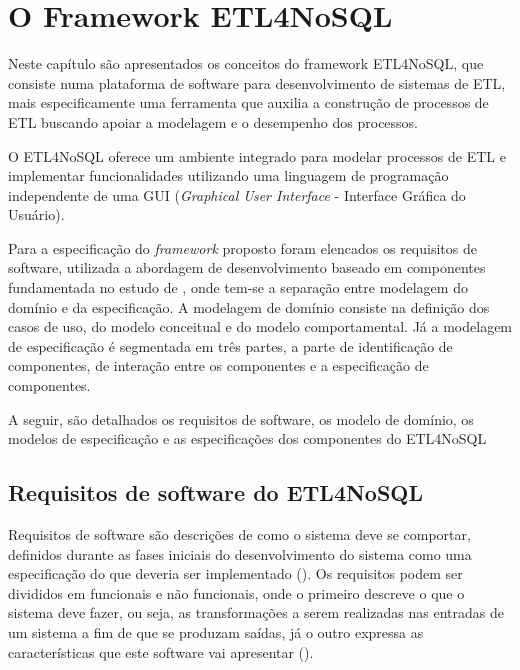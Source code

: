 \chapter{O Framework ETL4NoSQL}
Neste capítulo são apresentados os conceitos do framework ETL4NoSQL, que consiste numa plataforma de software para desenvolvimento de sistemas de ETL, mais especificamente uma ferramenta que auxilia a construção de processos de ETL buscando apoiar a modelagem e o desempenho dos processos. 

O ETL4NoSQL oferece um ambiente integrado para modelar processos de ETL e implementar funcionalidades utilizando uma linguagem de programação independente de uma GUI (\emph{Graphical User Interface} - Interface Gráfica do Usuário).


Para a especificação do \textit{framework} proposto foram  elencados os requisitos de software, utilizada a abordagem de desenvolvimento baseado em componentes fundamentada no estudo de \cite{cheesman:2001}, onde tem-se a separação entre modelagem do domínio e da especificação. A modelagem de domínio consiste na definição dos casos de uso, do modelo conceitual e do modelo comportamental. Já a modelagem de especificação é segmentada em três partes, a parte de identificação de componentes, de interação entre os componentes e a especificação de componentes.  


A seguir, são detalhados os requisitos de software, os modelo de domínio, os modelos de especificação e as especificações dos componentes do ETL4NoSQL


\clearpage
\section{Requisitos de software do ETL4NoSQL}


Requisitos de software são descrições de como o sistema deve se comportar, definidos durante as fases iniciais do desenvolvimento do sistema como uma especificação do que deveria ser implementado (\cite{sommerville:2013}). Os requisitos podem ser divididos em funcionais e não funcionais, onde o primeiro descreve o que o sistema deve fazer, ou seja, as transformações a serem realizadas nas entradas de um sistema a fim de que se produzam saídas, já o outro expressa as características que este software vai apresentar (\cite{sommerville:2013}). 

